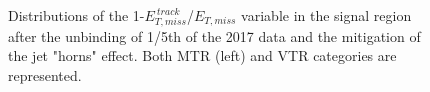 \begin{figure}[htbp]
  \centering
  \caption{Distributions of the 1-$E_{T,miss}^{~track}$/$E_{T, miss}$ variable in the signal region after the unbinding of 1/5th of the 2017 data and the mitigation of the jet "horns" effect. Both MTR (left) and VTR categories are represented.}
  \label{fig:2017_postHornCut_met_vs_tkmet}
\end{figure}

